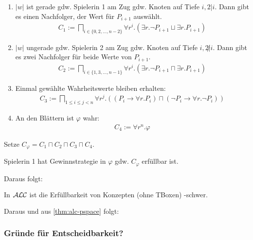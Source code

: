 \begin{enumerate}
    \item $|w|$ ist gerade gdw. Spielerin 1 am Zug gdw. Knoten auf Tiefe $i, 2|i$. Dann gibt es einen Nachfolger, der Wert für $P_{i + 1}$ auswählt.
        \begin{align*}
            C_1 := \bigsqcap_{i \in \{0, 2, \ldots, n - 2\}}
            \forall r^i.(\exists r.\neg P_{i + 1} \sqcup \exists r.P_{i + 1})
        \end{align*}
    \item $|w|$ ungerade gdw. Spielerin 2 am Zug gdw. Knoten auf Tiefe $i, 2 \not| i$. Dann gibt es zwei Nachfolger für beide Werte von $P_{i + 1}$.
        \begin{align*}
            C_2 := \bigsqcap_{i \in \{1, 3, \ldots, n - 1\}} 
            \forall r^i.(\exists r.\neg P_{i + 1} \sqcap \exists r.P_{i + 1})
        \end{align*}
    \item Einmal gewählte Wahrheitswerte bleiben erhalten:
        \begin{align*}
            C_3 := \bigsqcap_{1 \leq i \leq j < n} \forall r^j.\left( \left (
                    P_i \rightarrow \forall r.P_i
                    \right) \sqcap \left(
                    \neg P_i \rightarrow \forall r. \neg P_i
                \right)\right)
        \end{align*}
    \item An den Blättern ist $\varphi$ wahr:
        \begin{align*}
            C_4 := \forall r^n.\varphi
        \end{align*}
\end{enumerate}

Setze $C_\varphi = C_1 \sqcap C_2 \sqcap C_3 \sqcap C_4$.

\begin{lemma}
    Spielerin 1 hat Gewinnstrategie in $\varphi$ gdw. $C_\varphi$ erfüllbar ist.
\end{lemma}

Daraus folgt:

\begin{theorem}
    In $\mathcal{A}\mathcal{L}\mathcal{C}$ ist die Erfüllbarkeit von Konzepten (ohne TBoxen) \PSpace-schwer.
\end{theorem}

Daraus und aus \autoref{thm:alc-pspace} folgt:

\subsubsection{Gründe für Entscheidbarkeit?}

